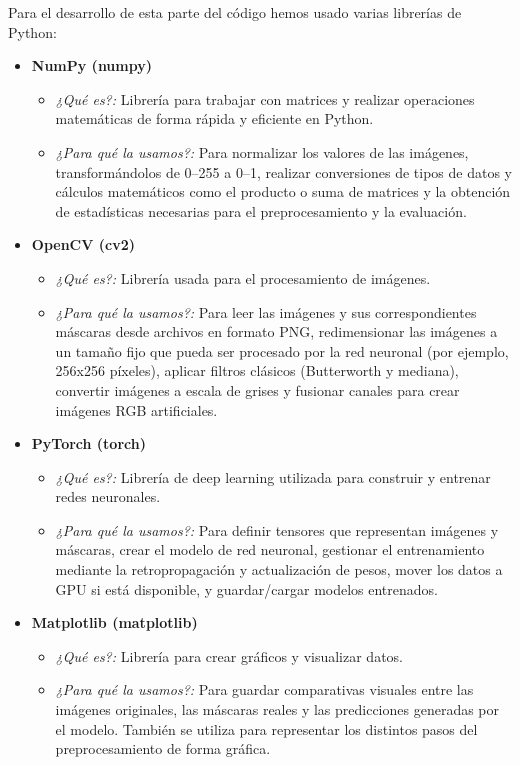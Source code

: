 \documentclass[12pt]{article}
\begin{document}
Para el desarrollo de esta parte del código hemos usado varias librerías de Python:

\begin{itemize}

    \item \textbf{NumPy (numpy)} \cite{numpy}
    \begin{itemize}
        \item \textit{¿Qué es?:} Librería para trabajar con matrices y realizar operaciones matemáticas de forma rápida y eficiente en Python.
        \item \textit{¿Para qué la usamos?:} Para normalizar los valores de las imágenes, transformándolos de 0--255 a 0--1, realizar conversiones de tipos de datos y cálculos matemáticos como el producto o suma de matrices y la obtención de estadísticas necesarias para el preprocesamiento y la evaluación.
    \end{itemize}
    
    \item \textbf{OpenCV (cv2)} \cite{opencv}
    \begin{itemize}
        \item \textit{¿Qué es?:} Librería usada para el procesamiento de imágenes.
        \item \textit{¿Para qué la usamos?:} Para leer las imágenes y sus correspondientes máscaras desde archivos en formato PNG, redimensionar las imágenes a un tamaño fijo que pueda ser procesado por la red neuronal (por ejemplo, 256x256 píxeles), aplicar filtros clásicos (Butterworth y mediana), convertir imágenes a escala de grises y fusionar canales para crear imágenes RGB artificiales.
    \end{itemize}

    \item \textbf{PyTorch (torch)} \cite{pytorch}
    \begin{itemize}
        \item \textit{¿Qué es?:} Librería de deep learning utilizada para construir y entrenar redes neuronales.
        \item \textit{¿Para qué la usamos?:} Para definir tensores que representan imágenes y máscaras, crear el modelo de red neuronal, gestionar el entrenamiento mediante la retropropagación y actualización de pesos, mover los datos a GPU si está disponible, y guardar/cargar modelos entrenados.
    \end{itemize}

    \item \textbf{Matplotlib (matplotlib)} \cite{matplotlib}
    \begin{itemize}
        \item \textit{¿Qué es?:} Librería para crear gráficos y visualizar datos.
        \item \textit{¿Para qué la usamos?:} Para guardar comparativas visuales entre las imágenes originales, las máscaras reales y las predicciones generadas por el modelo. También se utiliza para representar los distintos pasos del preprocesamiento de forma gráfica.
    \end{itemize}


\end{itemize}
\end{document}
